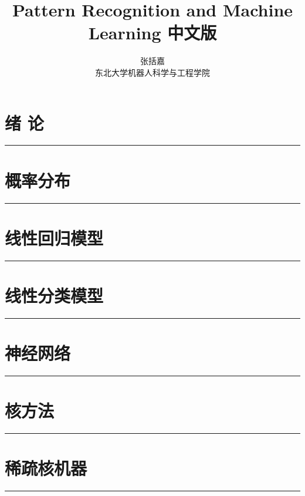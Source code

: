 \documentclass{book}
\author{张括嘉 \\ 东北大学机器人科学与工程学院}
\renewcommand {\thetable} {\thechapter{}.\arabic{table}}
\renewcommand {\thefigure} {\thechapter{}.\arabic{figure}}
\numberwithin{equation}{chapter}
\begin{document}
\title{Pattern Recognition and Machine Learning 中文版}
\date{}
	\chapter{绪 \quad 论}
	\noindent\rule[0.25\baselineskip]{\textwidth}{1pt}
	\renewcommand {\thetable} {\thechapter{}.\arabic{table}}
	\renewcommand {\thefigure} {\thechapter{}.\arabic{figure}}
	
	\chapter{概率分布}
	\noindent\rule[0.25\baselineskip]{\textwidth}{1pt}
	\renewcommand {\thetable} {\thechapter{}.\arabic{table}}
	\renewcommand {\thefigure} {\thechapter{}.\arabic{figure}}
	
	\chapter{线性回归模型}
	\noindent\rule[0.25\baselineskip]{\textwidth}{1pt}
	\renewcommand {\thetable} {\thechapter{}.\arabic{table}}
	\renewcommand {\thefigure} {\thechapter{}.\arabic{figure}}
	
	\chapter{线性分类模型}
	\noindent\rule[0.25\baselineskip]{\textwidth}{1pt}
	\renewcommand {\thetable} {\thechapter{}.\arabic{table}}
	\renewcommand {\thefigure} {\thechapter{}.\arabic{figure}}

	\chapter{神经网络}
	\noindent\rule[0.25\baselineskip]{\textwidth}{1pt}
	\renewcommand {\thetable} {\thechapter{}.\arabic{table}}
	\renewcommand {\thefigure} {\thechapter{}.\arabic{figure}}
	
	\chapter{核方法}
	\noindent\rule[0.25\baselineskip]{\textwidth}{1pt}
	\renewcommand {\thetable} {\thechapter{}.\arabic{table}}
	\renewcommand {\thefigure} {\thechapter{}.\arabic{figure}}

	\chapter{稀疏核机器}
	\noindent\rule[0.25\baselineskip]{\textwidth}{1pt}
	\renewcommand {\thetable} {\thechapter{}.\arabic{table}}
	\renewcommand {\thefigure} {\thechapter{}.\arabic{figure}}
\end{document}
